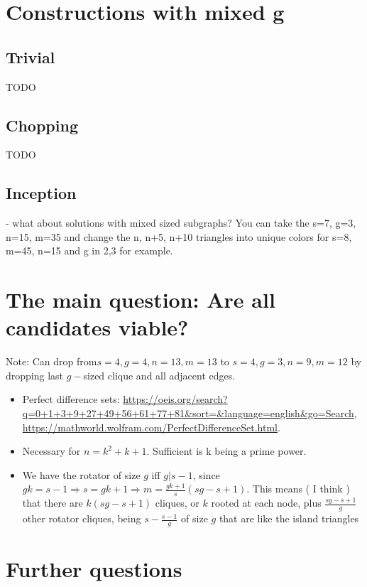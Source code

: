 \documentclass[11pt, oneside]{article} 	%
\begin{document}
\section{Constructions with mixed g}
\subsection{Trivial}
TODO
\subsection{Chopping}
TODO
\subsection{Inception}
- what about solutions with mixed sized subgraphs? 
You can take the s=7, g=3, n=15, m=35 and change the n, n+5, n+10 triangles into unique colors for s=8, m=45, n=15 and g in {2,3} for example.  


\section{The main question: Are all candidates viable?}

Note: Can drop from$s=4, g=4, n=13, m=13$ to $s=4, g=3, n=9, m=12$ by dropping last $g-$sized clique and all adjacent edges.

\begin{itemize}
\item Perfect difference sets: \url{https://oeis.org/search?q=0+1+3+9+27+49+56+61+77+81&sort=&language=english&go=Search}, \url{https://mathworld.wolfram.com/PerfectDifferenceSet.html}.
\item Necessary for $n = k^2+k+1$.  Sufficient is k being a prime power.
\item We have the rotator of size $g$ iff $g | s-1$, since $gk = s - 1 \Rightarrow s = gk+1 \Rightarrow m = \frac{gk+1}{s}(sg-s+1).$  This means ( I think ) that there are $k(sg-s+1)$ cliques, or $k$ rooted at each node, plus $\frac{sg-s+1}{g}$ other rotator cliques, being $s - \frac{s-1}g$ of size $g$ that are like the island triangles

\end{itemize}



\section{Further questions}

\end{document}
